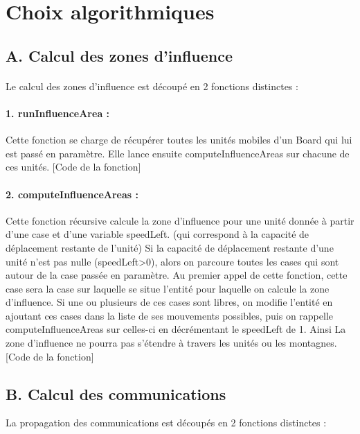 \documentclass[12pt]{article}
\begin{document}
	\section{Choix algorithmiques}    

		\subsection{A. Calcul des zones d'influence}
		
		\paragraph{}
		Le calcul des zones d'influence est découpé en 2 fonctions distinctes :
		
		\paragraph{1. runInfluenceArea : }
		Cette fonction se charge de récupérer toutes les unités mobiles d'un Board qui lui est passé en paramètre.
		Elle lance ensuite computeInfluenceAreas sur chacune de ces unités.
		[Code de la fonction]
		
		\paragraph{2. computeInfluenceAreas : }
		Cette fonction récursive calcule la zone d'influence pour une unité donnée à partir d'une case et d'une variable speedLeft. 
		(qui correspond à la capacité de déplacement restante de l'unité)
		Si la capacité de déplacement restante d'une unité n'est pas nulle (speedLeft\textgreater0), alors on parcoure toutes les cases 
		qui sont autour de la case passée en paramètre. 
		Au premier appel de cette fonction, cette case sera la case sur laquelle se situe l'entité pour laquelle on calcule la zone d'influence.
		Si une ou plusieurs de ces cases sont libres, on modifie l'entité en ajoutant ces cases dans la liste de ses mouvements possibles, 
		puis on rappelle computeInfluenceAreas sur celles-ci en décrémentant le speedLeft de 1.
		Ainsi La zone d'influence ne pourra pas s'étendre à travers les unités ou les montagnes.
		[Code de la fonction]
		
		\subsection{B. Calcul des communications}
		
		La propagation des communications est découpés en 2 fonctions distinctes :
		
\end{document}
